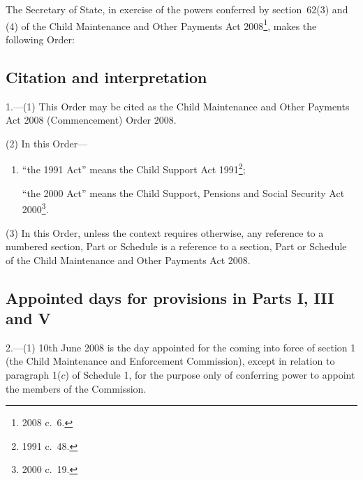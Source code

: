 \documentclass[12pt,a4paper]{article}
\title{\regstitle}
\author{S.I.\ 2008 No.\ 1476 (C.~67)}
\date{Made
9th June 2008
}
\begin{document}
\maketitle

\noindent
The Secretary of State, in exercise of the powers conferred by section~62(3) and (4) of the Child Maintenance and Other Payments Act 2008\footnote{2008 c.~6.}, makes the following Order: 

{\sloppy

\tableofcontents

}

\bigskip

\setcounter{secnumdepth}{-2}

\subsection[1. Citation and interpretation]{Citation and interpretation}

1.---(1)  This Order may be cited as the Child Maintenance and Other Payments Act 2008 (Commencement) Order 2008.

(2) In this Order—
\begin{enumerate}\item[]
“the 1991 Act” means the Child Support Act 1991\footnote{1991 c.~48.};

“the 2000 Act” means the Child Support, Pensions and Social Security Act 2000\footnote{2000 c.~19.}.
\end{enumerate}

(3) In this Order, unless the context requires otherwise, any reference to a numbered section, Part or Schedule is a reference to a section, Part or Schedule of the Child Maintenance and Other Payments Act 2008.

\subsection[2. Appointed days for provisions in Parts I, III and V]{Appointed days for provisions in Parts I, III and V}

2.---(1)  10th June 2008 is the day appointed for the coming into force of section 1 (the Child Maintenance and Enforcement Commission), except in relation to paragraph 1($c$)  of Schedule 1, for the purpose only of conferring power to appoint the members of the Commission.
\end{document}
